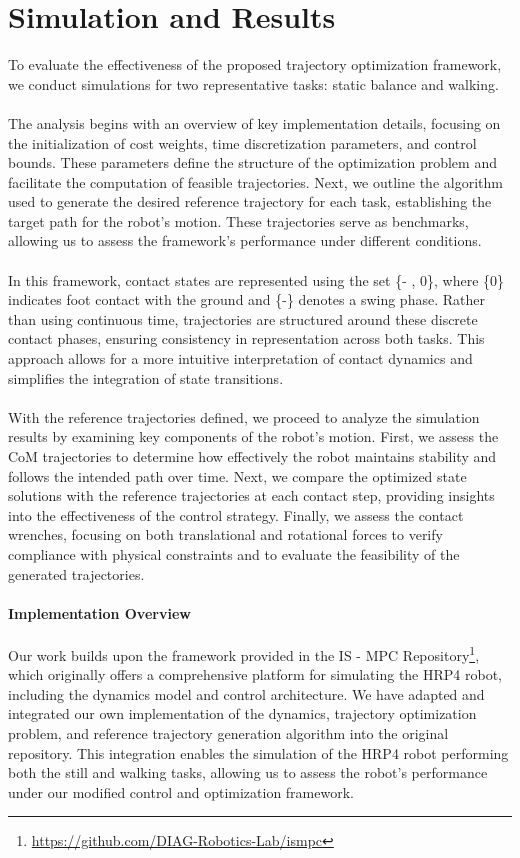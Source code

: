 \documentclass[main.tex]{subfiles}
\begin{document}
 
\begin{sloppypar}
\section{Simulation and Results}
\label{sec:newsimulation}
To evaluate the effectiveness of the proposed trajectory optimization framework, we conduct simulations for two representative tasks: static balance and walking. \\
\\
The analysis begins with an overview of key implementation details, focusing on the initialization of cost weights, time discretization parameters, and control bounds. These parameters define the structure of the optimization problem and facilitate the computation of feasible trajectories. Next, we outline the algorithm used to generate the desired reference trajectory for each task, establishing the target path for the robot’s motion. These trajectories serve as benchmarks, allowing us to assess the framework’s performance under different conditions.\\
\\
In this framework, contact states are represented using the set \{- , 0\}, where \{0\} indicates foot contact with the ground and \{-\} denotes a swing phase. Rather than using continuous time, trajectories are structured around these discrete contact phases, ensuring consistency in representation across both tasks. This approach allows for a more intuitive interpretation of contact dynamics and simplifies the integration of state transitions. \\
\\
With the reference trajectories defined, we proceed to analyze the simulation results by examining key components of the robot’s motion. First, we assess the CoM trajectories to determine how effectively the robot maintains stability and follows the intended path over time. Next, we compare the optimized state solutions with the reference trajectories at each contact step, providing insights into the effectiveness of the control strategy. Finally, we assess the contact wrenches, focusing on both translational and rotational forces to verify compliance with physical constraints and to evaluate the feasibility of the generated trajectories. \\
\paragraph{Implementation Overview}
Our work builds upon the framework provided in the IS - MPC Repository\footnote{\url{https://github.com/DIAG-Robotics-Lab/ismpc}}, which originally offers a comprehensive platform for simulating the HRP4 robot, including the dynamics model and control architecture. We have adapted and integrated our own implementation of the dynamics, trajectory optimization problem, and reference trajectory generation algorithm into the original repository. This integration enables the simulation of the HRP4 robot performing both the still and walking tasks, allowing us to assess the robot’s performance under our modified control and optimization framework.

\end{sloppypar}
\end{document}
